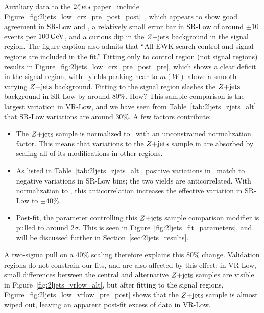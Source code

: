 Auxiliary data to the $\twoljets$ paper~\cite{atlas2022searches} include
Figure~\ref{fig:2ljets_low_crz_pre_post_post}~\cite{hepdata.116034.v1/t101},
which appears to show good agreement in SR-Low and \crz, a relatively
small error bar in SR-Low of around $\pm10$ events per $100\,\eV[G]$,
and a curious dip in the $\zjets$ background in the signal region.
The figure caption also admits that
``All EWK search control and signal regions are included in the fit.''
Fitting only to control region (not signal regions) results in
Figure~\ref{fig:2ljets_low_crz_pre_post_pre}, which shows a clear deficit in
the signal region, with \diboson\ yields peaking near to $m(W)$ above a smooth
varying $\zjets$ background.
Fitting to the signal region slashes the $\zjets$ background in SR-Low by
around $80\%$. How?
This sample comparison is the largest variation in VR-Low, and we have seen
from Table~\ref{tab:2ljets_zjets_alt} that SR-Low variations are around $30\%$.
A few factors contribute:
\begin{itemize}
\item The $\zjets$ sample is normalized to \crz\ with an unconstrained
normalization factor. This means that variations to the $\zjets$ sample in \crz
are absorbed by scaling all of its modifications in other regions.
\item As listed in Table~\ref{tab:2ljets_zjets_alt}, positive variations
in \crz\ match to negative variations in SR-Low bins; the two yields are
anticorrelated.
With normalization to \crz, this anticorrelation increases the effective
variation in SR-Low to $\pm40\%$.
\item Post-fit, the parameter controlling this $\zjets$ sample comparison
modifier is pulled to around $2\sigma$. This is seen in
Figure~\ref{fig:2ljets_fit_parameters}, and will be discussed further in
Section~\ref{sec:2ljets_results}.
\end{itemize}
A two-sigma pull on a $40\%$ scaling therefore explains this $80\%$ change.
Validation regions do not constrain our fits, and are also affected by
this effect; in VR-Low, small differences between the central and alternative
$\zjets$ samples are visible in Figure~\ref{fig:2ljets_vrlow_alt}, but
after fitting to the signal regions,
Figure~\ref{fig:2ljets_low_vrlow_pre_post} shows that the $\zjets$ sample
is almost wiped out, leaving an apparent post-fit excess of data in VR-Low.

